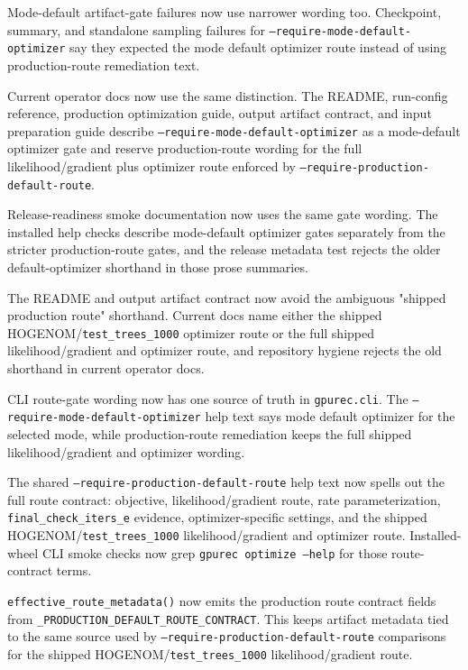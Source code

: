 \documentclass[11pt]{article}
\begin{document}
Mode-default artifact-gate failures now use narrower wording too.  Checkpoint,
summary, and standalone sampling failures for
\texttt{--require-mode-default-optimizer} say they expected the mode default
optimizer route instead of using production-route remediation text.

Current operator docs now use the same distinction.  The README, run-config
reference, production optimization guide, output artifact contract, and input
preparation guide describe \texttt{--require-mode-default-optimizer} as a
mode-default optimizer gate and reserve production-route wording for the full
likelihood/gradient plus optimizer route enforced by
\texttt{--require-production-default-route}.

Release-readiness smoke documentation now uses the same gate wording.  The
installed help checks describe mode-default optimizer gates separately from the
stricter production-route gates, and the release metadata test rejects the
older default-optimizer shorthand in those prose summaries.

The README and output artifact contract now avoid the ambiguous "shipped
production route" shorthand.  Current docs name either the shipped
HOGENOM/\texttt{test\_trees\_1000} optimizer route or the full shipped
likelihood/gradient and optimizer route, and repository hygiene rejects the
old shorthand in current operator docs.

CLI route-gate wording now has one source of truth in \texttt{gpurec.cli}.
The \texttt{--require-mode-default-optimizer} help text says mode default
optimizer for the selected mode, while production-route remediation keeps the
full shipped likelihood/gradient and optimizer wording.

The shared \texttt{--require-production-default-route} help text now spells out
the full route contract: objective, likelihood/gradient route, rate
parameterization, \texttt{final\_check\_iters\_e} evidence, optimizer-specific
settings, and the shipped HOGENOM/\texttt{test\_trees\_1000}
likelihood/gradient and optimizer route.  Installed-wheel CLI smoke checks now
grep \texttt{gpurec optimize --help} for those route-contract terms.

\texttt{effective\_route\_metadata()} now emits the production route contract
fields from \texttt{\_PRODUCTION\_DEFAULT\_ROUTE\_CONTRACT}.  This keeps
artifact metadata tied to the same source used by
\texttt{--require-production-default-route} comparisons for the shipped
HOGENOM/\texttt{test\_trees\_1000} likelihood/gradient route.
\end{document}
